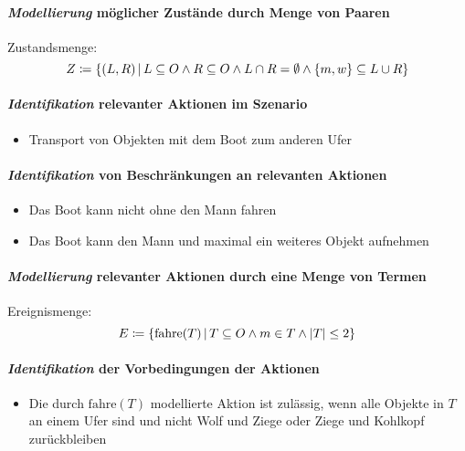 		    \paragraph{\textit{Modellierung} möglicher Zustände durch Menge von Paaren}
			    Zustandsmenge:
			    \[ Z \coloneqq \{ (L, R) \,\vert\, L \subseteq O \land R \subseteq O \land L \cap R = \emptyset \land \{ m, w \} \subseteq L \cup R \} \]
		    
		    \paragraph{\textit{Identifikation} relevanter Aktionen im Szenario}
			    \begin{itemize}
			    	\item Transport von Objekten mit dem Boot zum anderen Ufer
			    \end{itemize}
		    
		    \paragraph{\textit{Identifikation} von Beschränkungen an relevanten Aktionen}
			    \begin{itemize}
			    	\item Das Boot kann nicht ohne den Mann fahren
			    	\item Das Boot kann den Mann und maximal ein weiteres Objekt aufnehmen
			    \end{itemize}
		    
		    \paragraph{\textit{Modellierung} relevanter Aktionen durch eine Menge von Termen}
			    Ereignismenge:
			    \[ E \coloneqq \{ \text{fahre}(T) \,\vert\, T \subseteq O \land m \in T \land \abs{T} \leq 2 \} \]
		    
		    \paragraph{\textit{Identifikation} der Vorbedingungen der Aktionen}
			    \begin{itemize}
			    	\item Die durch $ \text{fahre}(T) $ modellierte Aktion ist zulässig, wenn alle Objekte in $ T $ an einem Ufer sind und nicht Wolf und Ziege oder Ziege und Kohlkopf zurückbleiben
			    \end{itemize}
		    
